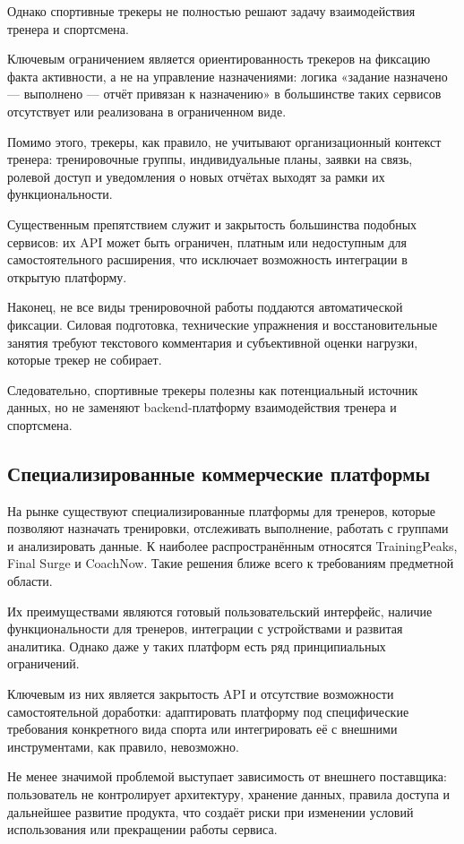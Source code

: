 Однако спортивные трекеры не полностью решают задачу взаимодействия тренера и спортсмена.

Ключевым ограничением является ориентированность трекеров на фиксацию факта активности, а не на управление назначениями: логика «задание назначено --- выполнено --- отчёт привязан к назначению» в большинстве таких сервисов отсутствует или реализована в ограниченном виде.

Помимо этого, трекеры, как правило, не учитывают организационный контекст тренера: тренировочные группы, индивидуальные планы, заявки на связь, ролевой доступ и уведомления о новых отчётах выходят за рамки их функциональности.

Существенным препятствием служит и закрытость большинства подобных сервисов: их API может быть ограничен, платным или недоступным для самостоятельного расширения, что исключает возможность интеграции в открытую платформу.

Наконец, не все виды тренировочной работы поддаются автоматической фиксации. Силовая подготовка, технические упражнения и восстановительные занятия требуют текстового комментария и субъективной оценки нагрузки, которые трекер не собирает.

Следовательно, спортивные трекеры полезны как потенциальный источник данных, но не заменяют backend-платформу взаимодействия тренера и спортсмена.

\subsection{Специализированные коммерческие платформы}

На рынке существуют специализированные платформы для тренеров, которые позволяют назначать тренировки, отслеживать выполнение, работать с группами и анализировать данные. К наиболее распространённым относятся TrainingPeaks, Final Surge и CoachNow. Такие решения ближе всего к требованиям предметной области.

Их преимуществами являются готовый пользовательский интерфейс, наличие функциональности для тренеров, интеграции с устройствами и развитая аналитика. Однако даже у таких платформ есть ряд принципиальных ограничений.

Ключевым из них является закрытость API и отсутствие возможности самостоятельной доработки: адаптировать платформу под специфические требования конкретного вида спорта или интегрировать её с внешними инструментами, как правило, невозможно.

Не менее значимой проблемой выступает зависимость от внешнего поставщика: пользователь не контролирует архитектуру, хранение данных, правила доступа и дальнейшее развитие продукта, что создаёт риски при изменении условий использования или прекращении работы сервиса.

